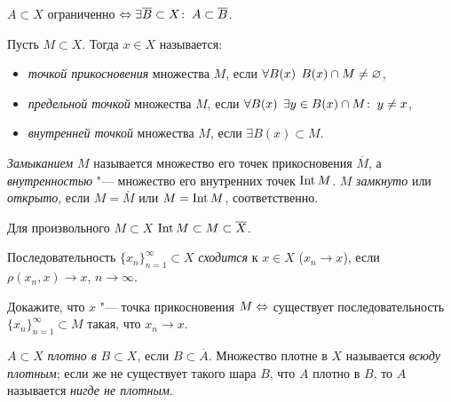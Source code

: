 \documentclass[main]{subfiles}
\begin{document}
\begin{exercise}
  \( A \subset X \) ограниченно \( \Leftrightarrow \exists \overline{B} \subset X \colon \:
  A \subset \overline{B} \).
\end{exercise}

\begin{definition}
  Пусть \( M \subset X \). Тогда \( x \in X \) называется:
  \begin{itemize}
    \item \emph{точкой прикосновения} множества \( M \), если
      \( \forall {B(x)} \; \, B(x) \cap M \ne \varnothing \),
    \item \emph{предельной точкой} множества \( M \),
      если \( \forall {B(x)} \; \, \exists y \in B(x) \cap M \colon \: y \ne x \),
    \item \emph{внутренней точкой} множества \( M \),
      если \( \exists B(x) \subset M \).
  \end{itemize}
  \emph{Замыканием} \( M \) называется множество его точек прикосновения
  \( \overline{M} \), а \emph{внутренностью} "--- множество его внутренних
  точек \( \operatorname{Int} M \). \( M \) \emph{замкнуто} или \emph{открыто},
  если \( M = \overline{M} \) или \( M = \operatorname{Int} M \), соответственно.
\end{definition}

\begin{remark}
  Для произвольного \( M \subset X \)
  \( \operatorname{Int} M \subset M \subset \overline{X} \).
\end{remark}

\begin{definition}
  Последовательность \( \{ x_n \}_{n=1}^\infty \subset X \)
  \emph{сходится} к \( x \in X \) (\( x_n \to x \)),
  если \( \rho(x_n, x) \to x \), \( n \to \infty \).
\end{definition}

\begin{exercise}
  Докажите, что \( x \) "--- точка прикосновения \( M \Leftrightarrow \)
  существует последовательность \( \{ x_n \}_{n=1}^\infty \subset M \)
  такая, что \( x_n \to x \).
\end{exercise}

\begin{definition}
  \( A \subset X \) \emph{плотно в} \( B \subset X \),
  если \( B \subset \overline{A} \).
  Множество плотне в \( X \) называется \emph{всюду плотным};
  если же не существует такого шара \( B \),
  что \( A \) плотно в \( B \),
  то \( A \) называется \emph{нигде не плотным}.
\end{definition}
\end{document}

